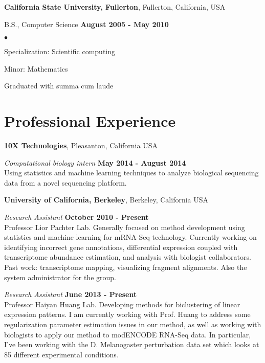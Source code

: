 \documentclass[margin,line]{res}
\newenvironment{list2}{
  \begin{list}{$\bullet$}{%
      \setlength{\itemsep}{0in}
      \setlength{\parsep}{0in} \setlength{\parskip}{0in}
      \setlength{\topsep}{0in} \setlength{\partopsep}{0in} 
      \setlength{\leftmargin}{0.2in}}}{\end{list}}
\begin{document}
\begin{resume}
{\bf California State University, Fullerton}, Fullerton, California, USA

\vspace{-.3cm}
B.S., Computer Science \hfill {\bf August 2005 - May 2010}\\
\vspace{-.45cm}
\begin{list2}
\vspace*{1mm}
\item Specialization: Scientific computing
\item Minor: Mathematics
\item Graduated with summa cum laude
\end{list2}

\section{\sc Professional Experience}

{\bf 10X Technologies}, Pleasanton, California USA
\vspace{-.3cm}

{\em Computational biology intern} \hfill {\bf May 2014 - August 2014}\\ 
Using statistics and machine learning techniques to analyze biological
sequencing data from a novel sequencing platform.

{\bf University of California, Berkeley}, Berkeley, California USA
\vspace{-.3cm}

{\em Research Assistant} \hfill {\bf October 2010 - Present}\\ 
Professor Lior Pachter Lab. Generally focused on method development using
statistics and machine learning for mRNA-Seq technology. Currently working on
identifying incorrect gene annotations, differential expression coupled with
transcriptome abundance estimation, and analysis with biologist collaborators.
Past work: transcriptome mapping, visualizing fragment alignments. Also the
system administrator for the group.

{\em Research Assistant} \hfill {\bf June 2013 - Present}\\ 
Professor Haiyan Huang Lab. Developing methods for biclustering of linear
expression patterns. I am currently working with Prof. Huang to address some
regularization parameter estimation issues in our method, as well as working
with biologists to apply our method to modENCODE RNA-Seq data. In particular,
I've been working with the D. Melanogaster perturbation data set which looks at
85 different experimental conditions.



\end{resume}
\end{document}
